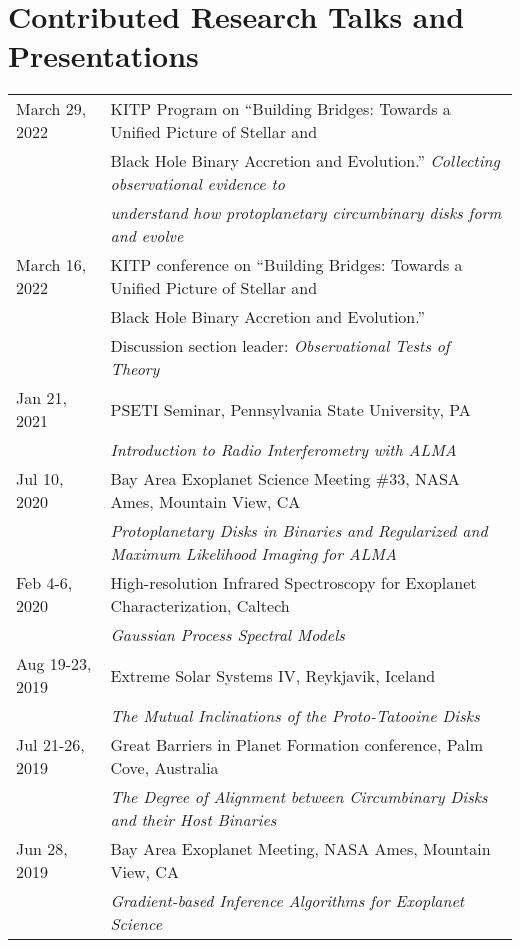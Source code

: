 \section*{Contributed Research Talks and Presentations}
\setlength\LTleft{0pt}
\setlength\LTright{0pt}
\begin{longtable}{@{\hspace{10pt}}p{1.2in}l}
  March 29, 2022 & KITP Program on ``Building Bridges: Towards a Unified Picture of Stellar and \\
  & Black Hole Binary Accretion and Evolution.''  \emph{Collecting observational evidence to}\\
  & \emph{understand how protoplanetary circumbinary disks form and evolve}\\[\rowskip] 
  March 16, 2022 & KITP conference on ``Building Bridges: Towards a Unified Picture of Stellar and \\
  & Black Hole Binary Accretion and Evolution.'' \\
  & Discussion section leader: \emph{Observational Tests of Theory}\\[\rowskip] 
  Jan 21, 2021 & PSETI Seminar, Pennsylvania State University, PA \\
  & \emph{Introduction to Radio Interferometry with ALMA}\\[\rowskip]
  Jul 10, 2020 & Bay Area Exoplanet Science Meeting \#33, NASA Ames, Mountain View, CA \\
  & \emph{Protoplanetary Disks in Binaries and Regularized and Maximum Likelihood Imaging for ALMA} \\
  Feb 4-6, 2020 & High-resolution Infrared Spectroscopy for Exoplanet Characterization, Caltech \\
  & \emph{Gaussian Process Spectral Models} \\[\rowskip]
  Aug 19-23, 2019 & Extreme Solar Systems IV, Reykjavik, Iceland\\ 
  & \emph{The Mutual Inclinations of the Proto-Tatooine Disks} \\[\rowskip]
  Jul 21-26, 2019 & Great Barriers in Planet Formation conference, Palm Cove, Australia\\
  & \emph{The Degree of Alignment between Circumbinary Disks and their Host Binaries} \\[\rowskip]
  Jun 28, 2019 & Bay Area Exoplanet Meeting, NASA Ames, Mountain View, CA\\
  & \emph{Gradient-based Inference Algorithms for Exoplanet Science} \\[\rowskip]

\end{longtable}
